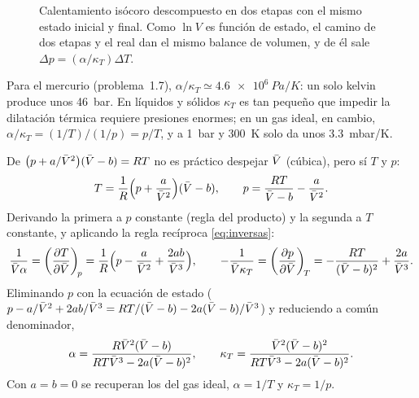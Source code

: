 \begin{figure}[htbp]
\centering
{}
\caption{Calentamiento isócoro descompuesto en dos etapas con el mismo estado inicial y final. Como
$\ln V$ es función de estado, el camino de dos etapas y el real dan el mismo balance de volumen, y de
él sale $\Delta p=(\alpha/\kappa_T)\Delta T$.}
\label{fig:dosetapas}
\end{figure}

\begin{observacion}
Para el mercurio (problema~1.7), $\alpha/\kappa_T\simeq\SI{4,6e6}{Pa/K}$: un solo kelvin produce unos
\SI{46}{bar}. En líquidos y sólidos $\kappa_T$ es tan pequeño que impedir la dilatación térmica
requiere presiones enormes; en un gas ideal, en cambio, $\alpha/\kappa_T=(1/T)/(1/p)=p/T$, y a
\SI{1}{bar} y \SI{300}{K} solo da unos \SI{3,3}{mbar/K}.
\end{observacion}

\begin{ejemplo}\label{ej:vdw}
De $\bigl(p+a/\bar{V}^2\bigr)(\bar{V}-b)=RT$ no es práctico despejar $\bar{V}$ (cúbica), pero sí $T$ y $p$:
\[
  T=\frac1R\Bigl(p+\frac{a}{\bar{V}^2}\Bigr)(\bar{V}-b),\qquad p=\frac{RT}{\bar{V}-b}-\frac{a}{\bar{V}^2}.
\]
Derivando la primera a $p$ constante (regla del producto) y la segunda a $T$ constante, y aplicando la
regla recíproca \eqref{eq:inversas}:
\[
  \frac{1}{\bar{V}\alpha}=\left(\frac{\partial T}{\partial \bar{V}}\right)_{\!p}=\frac1R\Bigl(p-\frac{a}{\bar{V}^2}+\frac{2ab}{\bar{V}^3}\Bigr),\qquad
  -\frac{1}{\bar{V}\kappa_T}=\left(\frac{\partial p}{\partial \bar{V}}\right)_{\!T}=-\frac{RT}{(\bar{V}-b)^2}+\frac{2a}{\bar{V}^3}.
\]
Eliminando $p$ con la ecuación de estado ($p-a/\bar{V}^2+2ab/\bar{V}^3=RT/(\bar{V}-b)-2a(\bar{V}-b)/\bar{V}^3$) y
reduciendo a común denominador,
\[
  \alpha=\frac{R\bar{V}^2(\bar{V}-b)}{RT\bar{V}^3-2a(\bar{V}-b)^2},\qquad
  \kappa_T=\frac{\bar{V}^2(\bar{V}-b)^2}{RT\bar{V}^3-2a(\bar{V}-b)^2}.
\]
Con $a=b=0$ se recuperan los del gas ideal, $\alpha=1/T$ y $\kappa_T=1/p$.
\end{ejemplo}
